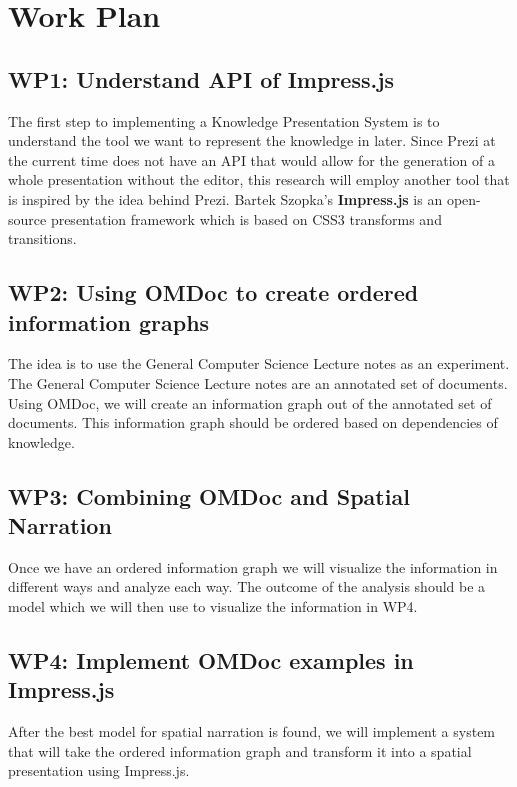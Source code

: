 \documentclass[twoside]{article}
\newcommand{\sys}{Knowledge Presentation System\xspace}
\begin{document}
\newpage

\section{Work Plan}
\subsection{WP1: Understand API of Impress.js}

The first step to implementing a \sys is to understand the tool we want to represent the knowledge in later. Since Prezi at the current time does not have an API that would allow for the generation of a whole presentation without the editor, this research will employ another tool that is inspired by the idea behind Prezi. Bartek Szopka's \textbf{Impress.js} is an open-source presentation framework which is based on CSS3 transforms and transitions.\cite{Impress} \\

\subsection{WP2: Using OMDoc to create ordered information graphs}
The idea is to use the General Computer Science Lecture notes as an experiment. The General Computer Science Lecture notes are an annotated set of documents. Using OMDoc, we will create an information graph out of the annotated set of documents. This information graph should be ordered based on dependencies of knowledge.\\

\subsection{WP3: Combining OMDoc and Spatial Narration}
Once we have an ordered information graph we will visualize the information in different ways and analyze each way. The outcome of the analysis should be a model which we will then use to visualize the information in WP4.\\

\subsection{WP4: Implement OMDoc examples in Impress.js}
After the best model for spatial narration is found, we will implement a system that will take the ordered information graph and transform it into a spatial presentation using Impress.js.
\end{document}
